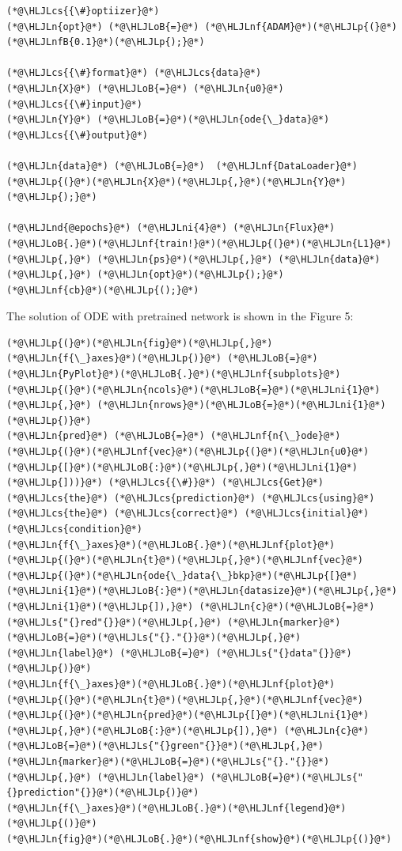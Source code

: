 \documentclass[12pt,a4paper]{article}
\newcommand{\HLJLn}[1]{#1}
\newcommand{\HLJLnd}[1]{\textcolor[RGB]{214,102,97}{#1}}
\newcommand{\HLJLnf}[1]{\textcolor[RGB]{66,102,213}{#1}}
\newcommand{\HLJLs}[1]{\textcolor[RGB]{201,61,57}{#1}}
\newcommand{\HLJLnfB}[1]{\textcolor[RGB]{59,151,46}{#1}}
\newcommand{\HLJLni}[1]{\textcolor[RGB]{59,151,46}{#1}}
\newcommand{\HLJLoB}[1]{\textcolor[RGB]{102,102,102}{\textbf{#1}}}
\newcommand{\HLJLp}[1]{#1}
\newcommand{\HLJLcs}[1]{\textcolor[RGB]{153,153,119}{\textit{#1}}}
\begin{document}
\begin{lstlisting}
(*@\HLJLcs{{\#}optiizer}@*)
(*@\HLJLn{opt}@*) (*@\HLJLoB{=}@*) (*@\HLJLnf{ADAM}@*)(*@\HLJLp{(}@*)(*@\HLJLnfB{0.1}@*)(*@\HLJLp{);}@*)

(*@\HLJLcs{{\#}format}@*) (*@\HLJLcs{data}@*)
(*@\HLJLn{X}@*) (*@\HLJLoB{=}@*) (*@\HLJLn{u0}@*) (*@\HLJLcs{{\#}input}@*)
(*@\HLJLn{Y}@*) (*@\HLJLoB{=}@*)(*@\HLJLn{ode{\_}data}@*) (*@\HLJLcs{{\#}output}@*) 

(*@\HLJLn{data}@*) (*@\HLJLoB{=}@*)  (*@\HLJLnf{DataLoader}@*)(*@\HLJLp{(}@*)(*@\HLJLn{X}@*)(*@\HLJLp{,}@*)(*@\HLJLn{Y}@*)(*@\HLJLp{);}@*)

(*@\HLJLnd{@epochs}@*) (*@\HLJLni{4}@*) (*@\HLJLn{Flux}@*)(*@\HLJLoB{.}@*)(*@\HLJLnf{train!}@*)(*@\HLJLp{(}@*)(*@\HLJLn{L1}@*)(*@\HLJLp{,}@*) (*@\HLJLn{ps}@*)(*@\HLJLp{,}@*) (*@\HLJLn{data}@*)(*@\HLJLp{,}@*) (*@\HLJLn{opt}@*)(*@\HLJLp{);}@*)
(*@\HLJLnf{cb}@*)(*@\HLJLp{();}@*)
\end{lstlisting}

The solution of ODE with pretrained network is shown in the Figure 5:


\begin{lstlisting}
(*@\HLJLp{(}@*)(*@\HLJLn{fig}@*)(*@\HLJLp{,}@*) (*@\HLJLn{f{\_}axes}@*)(*@\HLJLp{)}@*) (*@\HLJLoB{=}@*) (*@\HLJLn{PyPlot}@*)(*@\HLJLoB{.}@*)(*@\HLJLnf{subplots}@*)(*@\HLJLp{(}@*)(*@\HLJLn{ncols}@*)(*@\HLJLoB{=}@*)(*@\HLJLni{1}@*)(*@\HLJLp{,}@*) (*@\HLJLn{nrows}@*)(*@\HLJLoB{=}@*)(*@\HLJLni{1}@*)(*@\HLJLp{)}@*)
(*@\HLJLn{pred}@*) (*@\HLJLoB{=}@*) (*@\HLJLnf{n{\_}ode}@*)(*@\HLJLp{(}@*)(*@\HLJLnf{vec}@*)(*@\HLJLp{(}@*)(*@\HLJLn{u0}@*)(*@\HLJLp{[}@*)(*@\HLJLoB{:}@*)(*@\HLJLp{,}@*)(*@\HLJLni{1}@*)(*@\HLJLp{]))}@*) (*@\HLJLcs{{\#}}@*) (*@\HLJLcs{Get}@*) (*@\HLJLcs{the}@*) (*@\HLJLcs{prediction}@*) (*@\HLJLcs{using}@*) (*@\HLJLcs{the}@*) (*@\HLJLcs{correct}@*) (*@\HLJLcs{initial}@*) (*@\HLJLcs{condition}@*)
(*@\HLJLn{f{\_}axes}@*)(*@\HLJLoB{.}@*)(*@\HLJLnf{plot}@*)(*@\HLJLp{(}@*)(*@\HLJLn{t}@*)(*@\HLJLp{,}@*)(*@\HLJLnf{vec}@*)(*@\HLJLp{(}@*)(*@\HLJLn{ode{\_}data{\_}bkp}@*)(*@\HLJLp{[}@*)(*@\HLJLni{1}@*)(*@\HLJLoB{:}@*)(*@\HLJLn{datasize}@*)(*@\HLJLp{,}@*)(*@\HLJLni{1}@*)(*@\HLJLp{]),}@*) (*@\HLJLn{c}@*)(*@\HLJLoB{=}@*)(*@\HLJLs{"{}red"{}}@*)(*@\HLJLp{,}@*) (*@\HLJLn{marker}@*)(*@\HLJLoB{=}@*)(*@\HLJLs{"{}."{}}@*)(*@\HLJLp{,}@*) (*@\HLJLn{label}@*) (*@\HLJLoB{=}@*) (*@\HLJLs{"{}data"{}}@*)(*@\HLJLp{)}@*)
(*@\HLJLn{f{\_}axes}@*)(*@\HLJLoB{.}@*)(*@\HLJLnf{plot}@*)(*@\HLJLp{(}@*)(*@\HLJLn{t}@*)(*@\HLJLp{,}@*)(*@\HLJLnf{vec}@*)(*@\HLJLp{(}@*)(*@\HLJLn{pred}@*)(*@\HLJLp{[}@*)(*@\HLJLni{1}@*)(*@\HLJLp{,}@*)(*@\HLJLoB{:}@*)(*@\HLJLp{]),}@*) (*@\HLJLn{c}@*)(*@\HLJLoB{=}@*)(*@\HLJLs{"{}green"{}}@*)(*@\HLJLp{,}@*) (*@\HLJLn{marker}@*)(*@\HLJLoB{=}@*)(*@\HLJLs{"{}."{}}@*)(*@\HLJLp{,}@*) (*@\HLJLn{label}@*) (*@\HLJLoB{=}@*)(*@\HLJLs{"{}prediction"{}}@*)(*@\HLJLp{)}@*)
(*@\HLJLn{f{\_}axes}@*)(*@\HLJLoB{.}@*)(*@\HLJLnf{legend}@*)(*@\HLJLp{()}@*)
(*@\HLJLn{fig}@*)(*@\HLJLoB{.}@*)(*@\HLJLnf{show}@*)(*@\HLJLp{()}@*)
\end{lstlisting}
\end{document}
